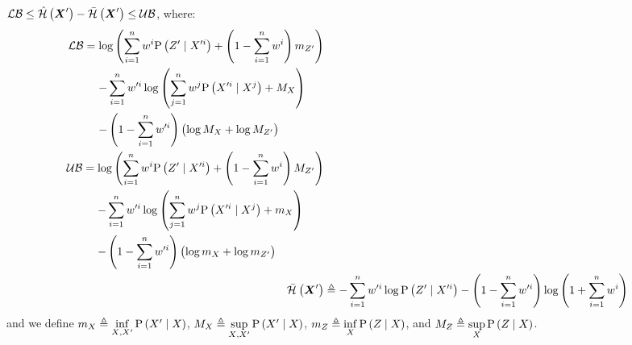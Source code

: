 \begin{proposition}
	\label{thm:boers_bounds_simple}
	$\operatorname*{\mathcal{LB}}\leq\hat{\mathcal{H}}\left({\boldsymbol X_{}^\prime}\right)-\bar{\mathcal{H}}_{}\left({\boldsymbol X_{}^\prime}\right)\leq\operatorname*{\mathcal{UB}}$, where:
	\begin{subequations}
		\begin{align}
			\begin{split}
				\lowerbound & =\log\left(\sum\limits_{i=1}^n\weight{}{i}\probcond{\observations{}^\prime}{\states{}^{\prime i}}+\left(1-\sum\limits_{i=1}^n\weight{}{i}\right)m_{\observations{}^\prime}\right) \\
				&\phantomeq-\sum_{i=1}^n\weight{}{\prime i}\log\left(\sum_{j=1}^n\weight{}{j}\probcond{\states{}^{\prime i}}{\states{}^j}+M_{\states{}}\right)\\
				& \phantomeq-\left(1-\sum_{i=1}^n\weight{}{\prime i}\right)\left(\log M_{\states{}}+\log M_{\observations{}^\prime}\right)
			\end{split}\\
			\begin{split}
				\upperbound & =\log\left(\sum\limits_{i=1}^n\weight{}{i}\probcond{\observations{}^\prime}{\states{}^{\prime i}}+\left(1-\sum\limits_{i=1}^n\weight{}{i}\right)M_{\observations{}^\prime}\right) \\
				&\phantomeq-\sum_{i=1}^n\weight{}{\prime i}\log\left(\sum_{j=1}^n\weight{}{j}\probcond{\states{}^{\prime i}}{\states{}^j}+m_{\states{}}\right)\\
				& \phantomeq-\left(1-\sum_{i=1}^n\weight{}{\prime i}\right)\left(\log m_{\states{}}+\log m_{\observations{}^\prime}\right)
			\end{split}\\
			\simplentropy{\statesRV{}^\prime}{} & \triangleq-\sum_{i=1}^n\weight{}{\prime i}\log\probcond{\observations{}^\prime}{\states{}^{\prime i}}-\left(1-\sum\limits_{i=1}^n\weight{}{\prime i}\right)\log\left(1+\sum\limits_{i=1}^n\weight{}{i}\right)
		\end{align}
	\end{subequations}
	and we define $m_{X_{}}\triangleq\inf\limits_{X_{},X_{}^\prime}\mathrm{P}\left({X_{}^\prime}\mid{\ensuremath{X_{}}}\right)$, $M_{X_{}}\triangleq\sup\limits_{X_{},X_{}^\prime}\mathrm{P}\left({X_{}^\prime}\mid{\ensuremath{X_{}}}\right)$, $m_{Z_{}}\triangleq\inf\limits_{X_{}}\mathrm{P}\left({Z_{}}\mid{\ensuremath{X_{}}}\right)$, and $M_{Z_{}}\triangleq\sup\limits_{X_{}}\mathrm{P}\left({Z_{}}\mid{\ensuremath{X_{}}}\right)$.
\end{proposition}
